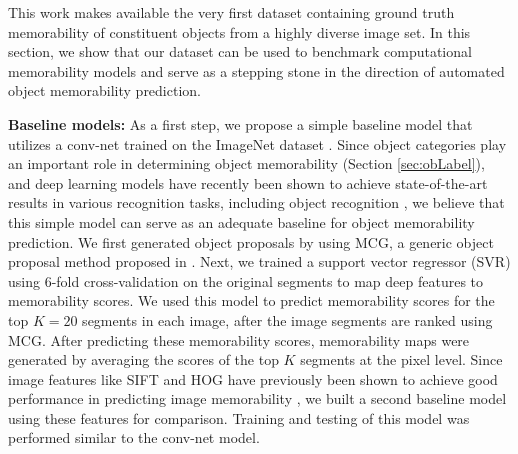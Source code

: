 This work makes available the very first dataset containing ground truth memorability of constituent objects from a highly diverse image set. In this section, we show that our dataset can be used to benchmark computational memorability models and serve as a stepping stone in the direction of automated object memorability prediction.

\vspace{3pt}\noindent\textbf{Baseline models:} As a first step, we propose a simple baseline model that utilizes a conv-net \cite{krizhevsky12,jia14} trained on the ImageNet dataset \cite{deng09}. Since object categories play an important role in determining object memorability (Section \ref{sec:obLabel}), and deep learning models have recently been shown to achieve state-of-the-art results in various recognition tasks, including object recognition \cite{cnn14,lee2009convolutional}, we believe  that this simple model can serve as an adequate baseline for object memorability prediction. We first generated object proposals by using MCG, a generic object proposal method proposed in \cite{arbelaez14}. Next, we trained a support vector regressor (SVR) using $6$-fold cross-validation on the original segments to map deep features to memorability scores. We used this model to predict memorability scores for the top $K=20$ segments in each image, after the image segments are ranked using MCG. After  predicting these memorability scores, memorability maps were generated by averaging the scores of the top $K$ segments at the pixel level. Since image features like SIFT \cite{lowe04} and HOG \cite{dalal05} have previously been shown to achieve good performance in predicting image memorability \cite{isola11,isola14}, we built a second baseline model using these features for comparison. Training and testing of this model was performed similar to the conv-net model.

